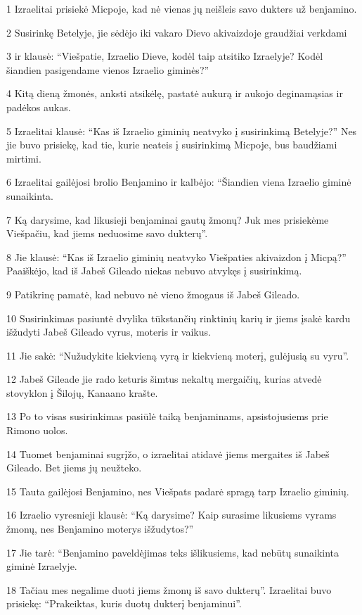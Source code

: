 \par 1 Izraelitai prisiekė Micpoje, kad nė vienas jų neišleis savo dukters už benjamino. 
\par 2 Susirinkę Betelyje, jie sėdėjo iki vakaro Dievo akivaizdoje graudžiai verkdami 
\par 3 ir klausė: “Viešpatie, Izraelio Dieve, kodėl taip atsitiko Izraelyje? Kodėl šiandien pasigendame vienos Izraelio giminės?” 
\par 4 Kitą dieną žmonės, anksti atsikėlę, pastatė aukurą ir aukojo deginamąsias ir padėkos aukas. 
\par 5 Izraelitai klausė: “Kas iš Izraelio giminių neatvyko į susirinkimą Betelyje?” Nes jie buvo prisiekę, kad tie, kurie neateis į susirinkimą Micpoje, bus baudžiami mirtimi. 
\par 6 Izraelitai gailėjosi brolio Benjamino ir kalbėjo: “Šiandien viena Izraelio giminė sunaikinta. 
\par 7 Ką darysime, kad likusieji benjaminai gautų žmonų? Juk mes prisiekėme Viešpačiu, kad jiems neduosime savo dukterų”. 
\par 8 Jie klausė: “Kas iš Izraelio giminių neatvyko Viešpaties akivaizdon į Micpą?” Paaiškėjo, kad iš Jabeš Gileado niekas nebuvo atvykęs į susirinkimą. 
\par 9 Patikrinę pamatė, kad nebuvo nė vieno žmogaus iš Jabeš Gileado. 
\par 10 Susirinkimas pasiuntė dvylika tūkstančių rinktinių karių ir jiems įsakė kardu išžudyti Jabeš Gileado vyrus, moteris ir vaikus. 
\par 11 Jie sakė: “Nužudykite kiekvieną vyrą ir kiekvieną moterį, gulėjusią su vyru”. 
\par 12 Jabeš Gileade jie rado keturis šimtus nekaltų mergaičių, kurias atvedė stovyklon į Šilojų, Kanaano krašte. 
\par 13 Po to visas susirinkimas pasiūlė taiką benjaminams, apsistojusiems prie Rimono uolos. 
\par 14 Tuomet benjaminai sugrįžo, o izraelitai atidavė jiems mergaites iš Jabeš Gileado. Bet jiems jų neužteko. 
\par 15 Tauta gailėjosi Benjamino, nes Viešpats padarė spragą tarp Izraelio giminių. 
\par 16 Izraelio vyresnieji klausė: “Ką darysime? Kaip surasime likusiems vyrams žmonų, nes Benjamino moterys išžudytos?” 
\par 17 Jie tarė: “Benjamino paveldėjimas teks išlikusiems, kad nebūtų sunaikinta giminė Izraelyje. 
\par 18 Tačiau mes negalime duoti jiems žmonų iš savo dukterų”. Izraelitai buvo prisiekę: “Prakeiktas, kuris duotų dukterį benjaminui”. 
